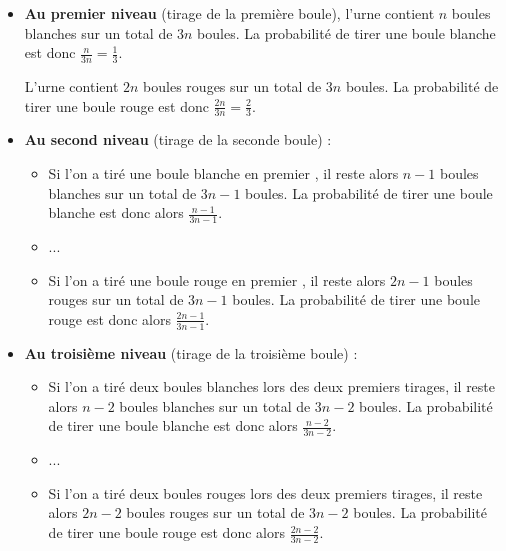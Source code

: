\begin{corrige}
\begin{enumerate}
\begin{center}
\begin{extern}
{      }
   \end{extern}
\end{center}
\begin{itemize}
               \item
               \textbf{Au premier niveau} (tirage de la première boule), l'urne contient $n$ boules blanches sur un total de $3n$ boules. La probabilité de tirer une boule blanche est donc $\frac{n}{3n} = \frac{1}{3}$.
               \par
               L'urne contient $2n$ boules rouges sur un total de $3n$ boules. La probabilité de tirer une boule rouge est donc $\frac{2n}{3n} = \frac{2}{3}$.
               \item
               \textbf{Au second niveau} (tirage de la seconde boule) :
               \begin{itemize}
                    \item
                    Si l'on a tiré une boule blanche en premier ,  il reste alors $n-1$ boules blanches sur un total de $3n-1$ boules. La probabilité de tirer une boule blanche est donc alors $\frac{n-1}{3n-1}$.
                    \item
                    ...
                    \item
                    Si l'on a tiré une boule rouge  en premier ,  il reste alors $2n-1$ boules rouges sur un total de $3n-1$ boules. La probabilité de tirer une boule rouge est donc alors $\frac{2n-1}{3n-1}$.
               \end{itemize}
               \item
               \textbf{Au troisième niveau} (tirage de la troisième boule) :
               \begin{itemize}
                    \item
                    Si l'on a tiré deux boules blanches lors des deux premiers tirages,  il reste alors $n-2$ boules blanches sur un total de $3n-2$ boules. La probabilité de tirer une boule blanche est donc alors $\frac{n-2}{3n-2}$.
                    \item
                    ...
                    \item
                    Si l'on a tiré deux boules rouges lors des deux premiers tirages, il reste alors $2n-2$ boules rouges sur un total de $3n-2$ boules. La probabilité de tirer une boule rouge est donc alors $\frac{2n-2}{3n-2}$.
               \end{itemize}
          \end{itemize}

\end{enumerate}
\end{corrige}
